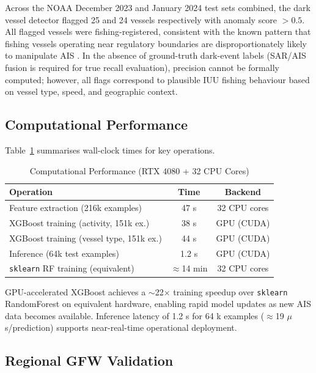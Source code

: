 \documentclass[journal]{IEEEtran}
\begin{document}
Across the NOAA December 2023 and January 2024 test sets combined,
the dark vessel detector flagged 25 and 24 vessels respectively with
anomaly score $>0.5$. All flagged vessels were fishing-registered,
consistent with the known pattern that fishing vessels operating near
regulatory boundaries are disproportionately likely to manipulate AIS
\cite{welch2021dark}.
%
In the absence of ground-truth dark-event labels (SAR/AIS fusion is
required for true recall evaluation), precision cannot be formally
computed; however, all flags correspond to plausible IUU fishing
behaviour based on vessel type, speed, and geographic context.

\subsection{Computational Performance}

Table~\ref{tab:compute} summarises wall-clock times for key operations.

\begin{table}[!t]
  \caption{Computational Performance (RTX 4080 + 32 CPU Cores)}
  \label{tab:compute}
  \centering
  \begin{tabular}{lcc}
    \toprule
    Operation & Time & Backend \\
    \midrule
    Feature extraction (216k examples) & 47 s & 32 CPU cores \\
    XGBoost training (activity, 151k ex.) & 38 s & GPU (CUDA) \\
    XGBoost training (vessel type, 151k ex.) & 44 s & GPU (CUDA) \\
    Inference (64k test examples) & 1.2 s & GPU (CUDA) \\
    \texttt{sklearn} RF training (equivalent) & $\approx$14 min & 32 CPU cores \\
    \bottomrule
  \end{tabular}
\end{table}

GPU-accelerated XGBoost achieves a $\sim$22$\times$ training speedup
over \texttt{sklearn} RandomForest on equivalent hardware, enabling rapid
model updates as new AIS data becomes available. Inference latency of
1.2 s for 64 k examples ($\approx$19 $\mu$s/prediction) supports near-real-time
operational deployment.

\subsection{Regional GFW Validation}
\end{document}
